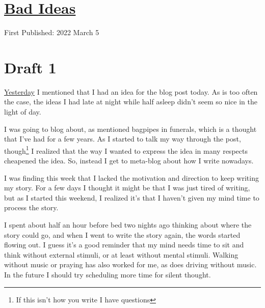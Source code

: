 \documentclass[12pt]{article}[titlepage]
\newcommand{\1}{\={a}}
\newcommand{\2}{\={e}}
\newcommand{\3}{\={\i}}
\newcommand{\4}{\=o}
\newcommand{\5}{\=u}
\newcommand{\6}{\={A}}
\renewcommand{\,}{\textsuperscript{,}}
\begin{document}
\doublespacing
\section{\href{bad-ideas.html}{Bad Ideas}}
First Published: 2022 March 5


\section{Draft 1}
\href{quick-post}{Yesterday} I mentioned that I had an idea for the blog post today.
As is too often the case, the ideas I had late at night while half asleep didn't seem so nice in the light of day.

I was going to blog about, as mentioned bagpipes in funerals, which is a thought that I've had for a few years.
As I started to talk my way through the post, though\footnote{If this isn't how you write I have questions} I realized that the way I wanted to express the idea in many respects cheapened the idea.
So, instead I get to meta-blog about how I write nowadays.

I was finding this week that I lacked the motivation and direction to keep writing my story.
For a few days I thought it might be that I was just tired of writing, but as I started this weekend, I realized it's that I haven't given my mind time to process the story.

I spent about half an hour before bed two nights ago thinking about where the story could go, and when I went to write the story again, the words started flowing out.
I guess it's a good reminder that my mind needs time to sit and think without external stimuli, or at least without mental stimuli.
Walking without music or praying has also worked for me, as does driving without music.
In the future I should try scheduling more time for silent thought.
\end{document}
